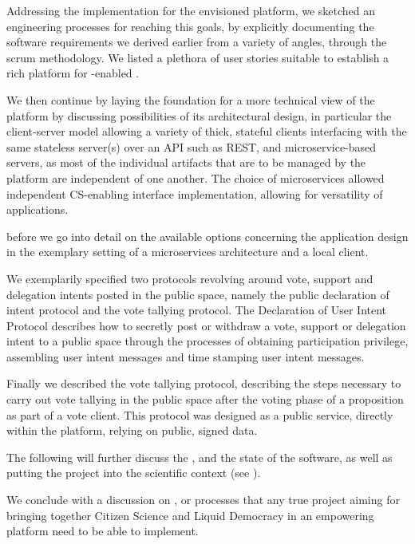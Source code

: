Addressing the implementation for the envisioned platform, we sketched an engineering processes for reaching this goals, by explicitly documenting the software requirements we derived earlier from a variety of angles, through the scrum methodology. We listed a plethora of user stories suitable to establish a rich platform for -enabled .

We then continue by laying the foundation for a more technical view of the
platform by discussing possibilities of its architectural design, in particular the client-server model allowing a variety of thick, stateful clients interfacing with the same stateless server(s) over an API such as REST, and microservice-based servers, as most of the individual artifacts that are to be managed by the platform are independent of one another. The choice of microservices allowed independent CS-enabling interface implementation, allowing for versatility of  applications. 


before we go into detail on the available
options concerning the application design in the exemplary setting of a microservices architecture
and a local client. 

We exemplarily specified two protocols revolving around vote, support
and delegation intents posted in the public space, namely the public declaration of intent protocol and the vote tallying protocol. 
The Declaration of User Intent Protocol describes how to secretly post or withdraw a vote, support or delegation intent to a public space through the processes of obtaining participation privilege, assembling user intent messages and time stamping user intent messages.

Finally we described the vote tallying protocol, describing the steps necessary to carry out vote tallying in the public
space after the voting phase of a proposition as part of a vote client. This protocol was designed as a public service, directly within the platform, relying on public, signed data.

The following will further discuss the , and the state of the software, as well as putting the project into the scientific context (see ).

We conclude with a discussion on , or processes that any true project aiming for bringing together Citizen Science and Liquid Democracy in an empowering platform need to be able to implement.

